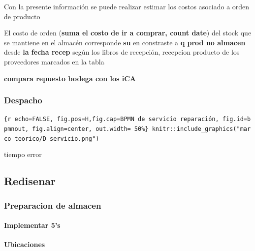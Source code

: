\documentclass[11pt]{article}
\begin{document}
Con la presente información se puede realizar estimar los costos
asociado a orden de producto

El costo de orden (\textbf{suma el costo de ir a comprar, count date})
del stock que se mantiene en el almacén corresponde \textbf{su} en
constraste a \textbf{q prod no almacen} desde \textbf{la fecha recep}
según los libros de recepción, recepcion producto de los proveedores
marcados en la tabla

\textbf{compara repuesto bodega con los iCA}

\hypertarget{despacho}{%
\subsubsection{Despacho}\label{despacho}}

\texttt{\{r\ echo=FALSE,\ fig.pos=\textquotesingle{}H\textquotesingle{},fig.cap=\textquotesingle{}BPMN\ de\ servicio\ reparación\textquotesingle{},\ fig.id=\textquotesingle{}bpmnout\textquotesingle{},\ fig.align=\textquotesingle{}center\textquotesingle{},\ out.width=\ \textquotesingle{}50\%\textquotesingle{}\}\ knitr::include\_graphics("marco\ teorico/D\_servicio.png")}

tiempo error

\hypertarget{redisenar}{%
\subsection{Redisenar}\label{redisenar}}

\hypertarget{preparacion-de-almacen}{%
\subsubsection{Preparacion de almacen}\label{preparacion-de-almacen}}

\hypertarget{implementar-5s}{%
\paragraph{Implementar 5's}\label{implementar-5s}}

\hypertarget{section}{%
\paragraph{}\label{section}}

\hypertarget{ubicaciones}{%
\paragraph{Ubicaciones}\label{ubicaciones}}
\end{document}
